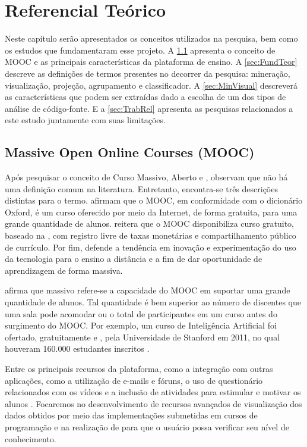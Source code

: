 \chapter{Referencial Teórico}
\label{chap:Ref}
	Neste capítulo serão apresentados os conceitos utilizados na pesquisa, bem como
	os estudos que fundamentaram esse projeto. A \cref{sec:Mooc} apresenta
	o conceito de MOOC e as principais características da plataforma de ensino.
	A \cref{sec:FundTeor} descreve as definições de termos presentes no
	decorrer da pesquisa: mineração, visualização, projeção, agrupamento e
	classificador. A \cref{sec:MinVisual} descreverá as características que
	podem ser extraídas dado a escolha de um dos tipos de análise de código-fonte.
	E a \cref{sec:TrabRel} apresenta as pesquisas relacionados a este estudo
	juntamente com suas limitações.

	\section{Massive Open Online Courses (MOOC)}
	\label{sec:Mooc}
		Após pesquisar o conceito de Curso Massivo, Aberto e ,
		 observam que não há uma definição comum na
		literatura. Entretanto, encontra-se três descrições distintas para o termo.
		 afirmam que o MOOC, em conformidade com o
		dicionário Oxford, é um curso oferecido por meio da Internet, de forma
		gratuita, para uma grande quantidade de alunos. 
		reitera que o MOOC disponibiliza curso gratuito, baseado na ,
		com registro livre de taxas monetárias e compartilhamento público de
		currículo. Por fim,  defende a tendência em inovação e
		experimentação do uso da tecnologia para o ensino a distância e
		 a fim de dar oportunidade de aprendizagem de forma massiva.
		
		 afirma que massivo refere-se a capacidade do MOOC em
		suportar uma grande quantidade de alunos. Tal quantidade é bem superior
		ao número de discentes que uma sala pode acomodar ou o total de
		participantes em um curso  antes do surgimento do MOOC.
		Por exemplo, um curso de Inteligência Artificial foi ofertado, gratuitamente e
		, pela Universidade de Stanford em 2011, no qual houveram
		160.000 estudantes inscritos \cite{rodriguez2012}.
		
		Entre os principais recursos da plataforma, como a integração com outras
		aplicações, como a utilização de e-mails e fóruns, o uso de questionário
		relacionados com os vídeos e a inclusão de atividades para estimular e
		motivar os alunos \cite{fassbinder2014}. Focaremos no desenvolvimento de
		recursos avançados de visualização dos dados obtidos por meio das
		implementações submetidas em cursos de programação e na realização de
		 para que o usuário possa verificar seu nível de conhecimento.

